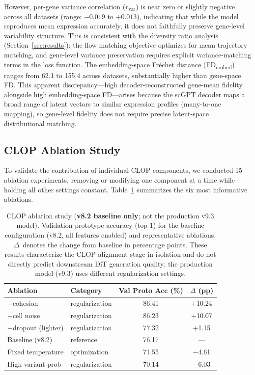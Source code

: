 \documentclass[preprint,12pt]{elsarticle}
\begin{document}
However, per-gene variance correlation ($r_\text{var}$) is near zero or slightly negative across all datasets (range: $-0.019$ to $+0.013$), indicating that while the model reproduces mean expression accurately, it does not faithfully preserve gene-level variability structure. This is consistent with the diversity ratio analysis (Section~\ref{sec:results}): the flow matching objective optimizes for mean trajectory matching, and gene-level variance preservation requires explicit variance-matching terms in the loss function. The embedding-space Fr\'{e}chet distance (FD\textsubscript{embed}) ranges from 62.1 to 155.4 across datasets, substantially higher than gene-space FD. This apparent discrepancy---high decoder-reconstructed gene-mean fidelity alongside high embedding-space FD---arises because the scGPT decoder maps a broad range of latent vectors to similar expression profiles (many-to-one mapping), so gene-level fidelity does not require precise latent-space distributional matching.

\subsection{CLOP Ablation Study}\label{sec:ablation}

To validate the contribution of individual CLOP components, we conducted 15 ablation experiments, removing or modifying one component at a time while holding all other settings constant. Table~\ref{tab:ablation} summarizes the six most informative ablations.

\begin{table}[!htbp]
\caption{CLOP ablation study (\textbf{v8.2 baseline only}; not the production v9.3 model). Validation prototype accuracy (top-1) for the baseline configuration (v8.2, all features enabled) and representative ablations. $\Delta$~denotes the change from baseline in percentage points. These results characterize the CLOP alignment stage in isolation and do not directly predict downstream DiT generation quality; the production model (v9.3) uses different regularization settings.\label{tab:ablation}}
\centering
\small
\begin{tabular}{llcc}
\toprule
\textbf{Ablation} & \textbf{Category} & \textbf{Val Proto Acc (\%)} & \textbf{$\Delta$ (pp)} \\
\midrule
$-$cohesion        & regularization & 86.41 & $+$10.24 \\
$-$cell noise      & regularization & 86.23 & $+$10.07 \\
$-$dropout (lighter) & regularization & 77.32 & $+$1.15 \\
Baseline (v8.2)    & reference      & 76.17 & --- \\
Fixed temperature   & optimization   & 71.55 & $-$4.61 \\
High variant prob   & regularization & 70.14 & $-$6.03 \\
\bottomrule
\end{tabular}
\end{table}
\end{document}

